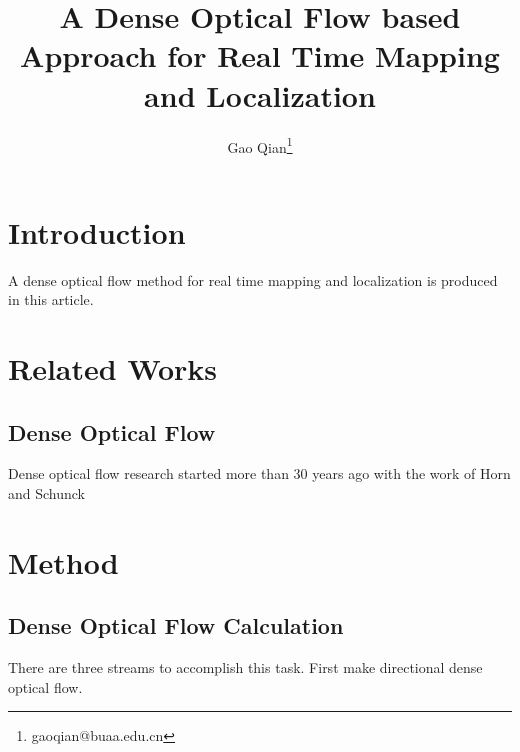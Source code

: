 \documentclass{article}
\title { A Dense Optical Flow based Approach for Real Time Mapping and Localization }
\author{   }
\author{Gao Qian\thanks{gaoqian@buaa.edu.cn}}
\affil{Department of Computer Science, BUAA University}
\begin{document}
\maketitle

\begin{abstract}
\end{abstract}

\section{Introduction}
A dense optical flow method for real time mapping and localization is produced in this article.

\section{Related Works}
\subsection{Dense Optical Flow}
Dense optical flow research started more than 30 years ago with the work of Horn and Schunck


\cite{Brox2004High}





\section{Method}
\subsection{Dense Optical Flow Calculation}
There are three streams to accomplish this task. First make directional dense optical flow.






\end{document}

